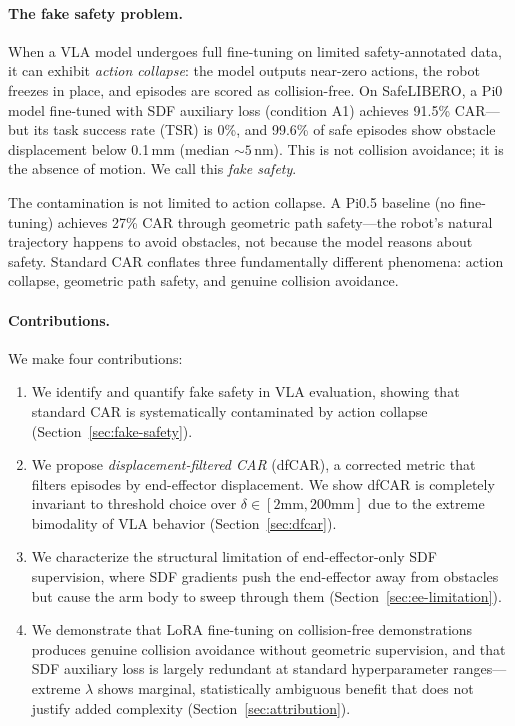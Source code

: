 \documentclass[letterpaper]{article}
\begin{document}
\paragraph{The fake safety problem.}
When a VLA model undergoes full fine-tuning on limited safety-annotated data, it can exhibit \emph{action collapse}: the model outputs near-zero actions, the robot freezes in place, and episodes are scored as collision-free. On SafeLIBERO, a Pi0 model fine-tuned with SDF auxiliary loss (condition A1) achieves 91.5\% CAR---but its task success rate (TSR) is 0\%, and 99.6\% of safe episodes show obstacle displacement below 0.1\,mm (median ${\sim}5$\,nm). This is not collision avoidance; it is the absence of motion. We call this \emph{fake safety}.

The contamination is not limited to action collapse. A Pi0.5 baseline (no fine-tuning) achieves 27\% CAR through geometric path safety---the robot's natural trajectory happens to avoid obstacles, not because the model reasons about safety. Standard CAR conflates three fundamentally different phenomena: action collapse, geometric path safety, and genuine collision avoidance.

\paragraph{Contributions.} We make four contributions:
\begin{enumerate}
\item We identify and quantify fake safety in VLA evaluation, showing that standard CAR is systematically contaminated by action collapse (Section~\ref{sec:fake-safety}).
\item We propose \emph{displacement-filtered CAR} (dfCAR), a corrected metric that filters episodes by end-effector displacement. We show dfCAR is completely invariant to threshold choice over $\delta \in [2\text{mm}, 200\text{mm}]$ due to the extreme bimodality of VLA behavior (Section~\ref{sec:dfcar}).
\item We characterize the structural limitation of end-effector-only SDF supervision, where SDF gradients push the end-effector away from obstacles but cause the arm body to sweep through them (Section~\ref{sec:ee-limitation}).
\item We demonstrate that LoRA fine-tuning on collision-free demonstrations produces genuine collision avoidance without geometric supervision, and that SDF auxiliary loss is largely redundant at standard hyperparameter ranges---extreme $\lambda$ shows marginal, statistically ambiguous benefit that does not justify added complexity (Section~\ref{sec:attribution}).
\end{enumerate}
\end{document}
